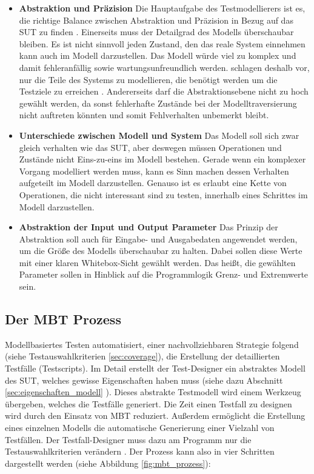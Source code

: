 \begin{itemize}
\item \textbf{Abstraktion und Präzision} Die Hauptaufgabe des Testmodellierers ist es, die richtige Balance zwischen Abstraktion und Präzision in Bezug auf das \gls{SUT} zu finden \cite{utting_practical_2007}. Einerseits muss der Detailgrad des Modells überschaubar bleiben. Es ist nicht sinnvoll jeden Zustand, den das reale System einnehmen kann auch im Modell darzustellen. Das Modell würde viel zu komplex und damit fehleranfällig sowie wartungsunfreundlich werden. \citeauthor{utting_practical_2007} schlagen deshalb vor, nur die Teile des Systems zu modellieren, die benötigt werden um die Testziele zu erreichen \cite{utting_practical_2007}. Andererseits darf die Abstraktionsebene nicht zu hoch gewählt werden, da sonst fehlerhafte Zustände bei der Modelltraversierung nicht auftreten könnten und somit Fehlverhalten unbemerkt bleibt. 
\item \textbf{Unterschiede zwischen Modell und System} Das Modell soll sich zwar gleich verhalten wie das \gls{SUT}, aber deswegen müssen Operationen und Zustände nicht Eins-zu-eins im Modell bestehen. Gerade wenn ein komplexer Vorgang modelliert werden muss, kann es Sinn machen dessen Verhalten aufgeteilt im Modell darzustellen. Genauso ist es erlaubt eine Kette von Operationen, die nicht interessant sind zu testen, innerhalb eines Schrittes im Modell darzustellen.
\item \textbf{Abstraktion der Input und Output Parameter} Das Prinzip der Abstraktion soll auch für Eingabe- und Ausgabedaten angewendet werden, um die Größe des Modells überschaubar zu halten. Dabei sollen diese Werte mit einer klaren Whitebox-Sicht gewählt werden. Das heißt, die gewählten Parameter sollen in Hinblick auf die Programmlogik Grenz- und Extremwerte sein.     
\end{itemize}

\subsection{Der MBT Prozess}
\label{sec:mbt_prozess}

Modellbasiertes Testen automatisiert, einer nachvollziehbaren Strategie folgend (siehe Testauswahlkriterien \ref{sec:coverage}), die Erstellung der detaillierten Testfälle (Testscripts).
Im Detail erstellt der Test-Designer ein abstraktes Modell des \Gls{SUT}, welches gewisse Eigenschaften haben muss (siehe dazu Abschnitt \ref{sec:eigenschaften_modell} ). Dieses abstrakte Testmodell wird einem Werkzeug übergeben, welches die Testfälle generiert. Die Zeit einen Testfall zu designen wird durch den Einsatz von \Gls{MBT} reduziert. Außerdem ermöglicht die Erstellung eines einzelnen Modells die automatische Generierung einer Vielzahl von Testfällen. Der Testfall-Designer muss dazu am Programm nur die Testauswahlkriterien verändern \cite{utting_practical_2007}. Der Prozess kann also in vier Schritten dargestellt werden (siehe Abbildung \ref{fig:mbt_prozess}):


